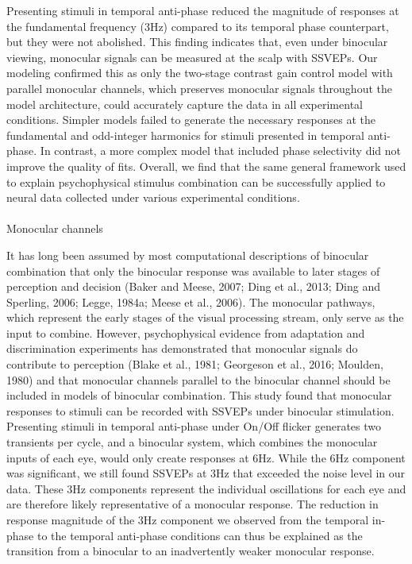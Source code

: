 \documentclass[
  12pt,
]{article}
\makeatletter
\let\oldparagraph\paragraph
\renewcommand{\paragraph}{
    \@ifstar
      \xxxParagraphStar
      \xxxParagraphNoStar
  }
\newcommand{\xxxParagraphStar}[1]{\oldparagraph*{#1}\mbox{}}
\newcommand{\xxxParagraphNoStar}[1]{\oldparagraph{#1}\mbox{}}
\makeatother
\begin{document}
Presenting stimuli in temporal anti-phase reduced the magnitude of
responses at the fundamental frequency (3Hz) compared to its temporal
phase counterpart, but they were not abolished. This finding indicates
that, even under binocular viewing, monocular signals can be measured at
the scalp with SSVEPs. Our modeling confirmed this as only the two-stage
contrast gain control model with parallel monocular channels, which
preserves monocular signals throughout the model architecture, could
accurately capture the data in all experimental conditions. Simpler
models failed to generate the necessary responses at the fundamental and
odd-integer harmonics for stimuli presented in temporal anti-phase. In
contrast, a more complex model that included phase selectivity did not
improve the quality of fits. Overall, we find that the same general
framework used to explain psychophysical stimulus combination can be
successfully applied to neural data collected under various experimental
conditions.

\paragraph{Monocular channels}\label{monocular-channels}

It has long been assumed by most computational descriptions of binocular
combination that only the binocular response was available to later
stages of perception and decision (Baker and Meese, 2007; Ding et al.,
2013; Ding and Sperling, 2006; Legge, 1984a; Meese et al., 2006). The
monocular pathways, which represent the early stages of the visual
processing stream, only serve as the input to combine. However,
psychophysical evidence from adaptation and discrimination experiments
has demonstrated that monocular signals do contribute to perception
(Blake et al., 1981; Georgeson et al., 2016; Moulden, 1980) and that
monocular channels parallel to the binocular channel should be included
in models of binocular combination. This study found that monocular
responses to stimuli can be recorded with SSVEPs under binocular
stimulation. Presenting stimuli in temporal anti-phase under On/Off
flicker generates two transients per cycle, and a binocular system,
which combines the monocular inputs of each eye, would only create
responses at 6Hz. While the 6Hz component was significant, we still
found SSVEPs at 3Hz that exceeded the noise level in our data. These 3Hz
components represent the individual oscillations for each eye and are
therefore likely representative of a monocular response. The reduction
in response magnitude of the 3Hz component we observed from the temporal
in-phase to the temporal anti-phase conditions can thus be explained as
the transition from a binocular to an inadvertently weaker monocular
response.
\end{document}

